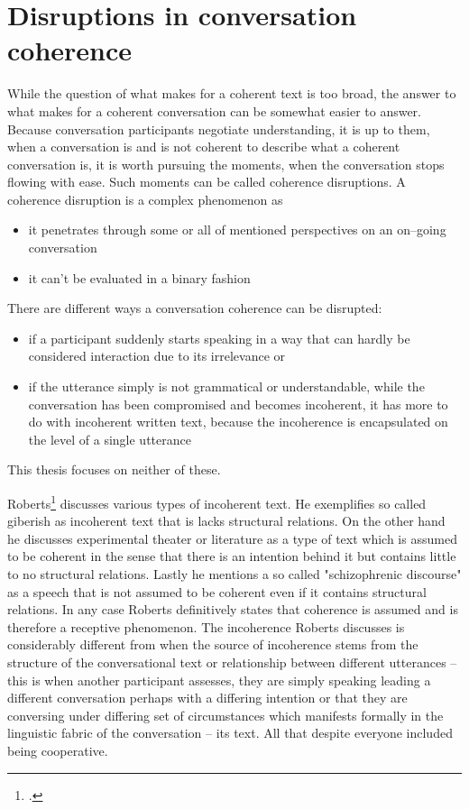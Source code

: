 \documentclass[12pt]{report}
\begin{document}
{\section{Disruptions in conversation coherence}
\par
While the question of what makes for a coherent text is too broad,
the answer to what makes for a coherent conversation can be somewhat easier to answer.
Because conversation participants negotiate understanding,
it is up to them, when a conversation is and is not coherent
to describe what a coherent conversation is,
it is worth pursuing the moments, when the conversation stops flowing with ease.
Such moments can be called coherence disruptions.
A coherence disruption is a complex phenomenon as

\begin{itemize}
\item
it penetrates through some or all of mentioned perspectives on an on–going conversation
\item
it can't be evaluated in a binary fashion
\end{itemize}

There are different ways a conversation coherence can be disrupted:
\begin{itemize}

\item
   if a participant suddenly starts speaking
    in a way that can hardly be considered interaction
    due to its irrelevance or

\item
   if the utterance simply is not grammatical or understandable,
    while the conversation has been compromised and becomes incoherent,
    it has more to do with incoherent written text, because
    the incoherence is encapsulated on the level of a single utterance
\end{itemize}

This thesis focuses on neither of these.

Roberts\footcite{Roberts01101993} discusses various types of incoherent text.
He exemplifies so called giberish as incoherent text that is lacks structural relations.
On the other hand he discusses experimental theater or literature as a type of text
which is assumed to be coherent in the sense that there is an intention behind it
but contains little to no structural relations.
Lastly he mentions a so called "schizophrenic discourse" as a speech that
is not assumed to be coherent even if it contains structural relations.
In any case Roberts definitively states that coherence is assumed
and is therefore a receptive phenomenon.
The incoherence Roberts discusses is considerably different from when
the source of incoherence stems from
    the structure of the conversational text or
    relationship between different utterances
    – this is when another participant assesses,
        they are simply speaking leading a different conversation
        perhaps with a differing intention
        or that they are conversing under differing set of circumstances
        which manifests formally in the linguistic fabric of the conversation – its text.
        All that despite everyone included being cooperative.

}
\end{document}
